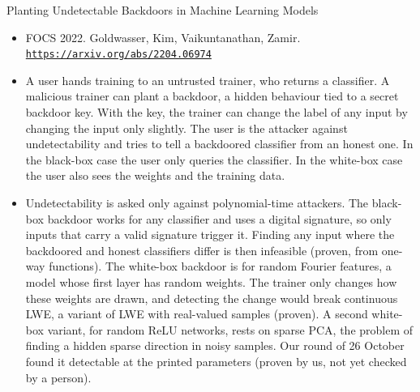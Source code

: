 \documentclass[aspectratio=169,10pt]{beamer}
\newcommand{\venue}[3]{\item #1. #2.\\ \href{#3}{\nolinkurl{#3}}}
\begin{document}
\begin{frame}{Planting Undetectable Backdoors in Machine Learning Models}
  \begin{itemize}
    \venue{FOCS 2022}{Goldwasser, Kim, Vaikuntanathan, Zamir}{https://arxiv.org/abs/2204.06974}
    \item A user hands training to an untrusted trainer, who returns a classifier. A malicious trainer can plant a backdoor, a hidden behaviour tied to a secret backdoor key. With the key, the trainer can change the label of any input by changing the input only slightly. The user is the attacker against undetectability and tries to tell a backdoored classifier from an honest one. In the black-box case the user only queries the classifier. In the white-box case the user also sees the weights and the training data.
    \item Undetectability is asked only against polynomial-time attackers. The black-box backdoor works for any classifier and uses a digital signature, so only inputs that carry a valid signature trigger it. Finding any input where the backdoored and honest classifiers differ is then infeasible (proven, from one-way functions). The white-box backdoor is for random Fourier features, a model whose first layer has random weights. The trainer only changes how these weights are drawn, and detecting the change would break continuous LWE, a variant of LWE with real-valued samples (proven). A second white-box variant, for random ReLU networks, rests on sparse PCA, the problem of finding a hidden sparse direction in noisy samples. Our round of 26 October found it detectable at the printed parameters (proven by us, not yet checked by a person).
  \end{itemize}
\end{frame}
\end{document}

